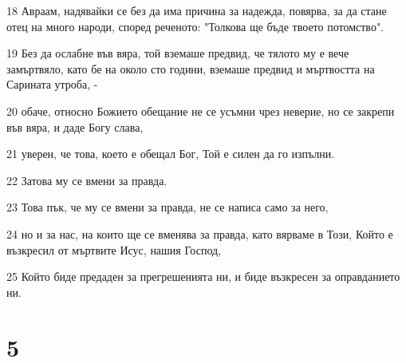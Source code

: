 \par 18 Авраам, надявайки се без да има причина за надежда, повярва, за да стане отец на много народи, според реченото: "Толкова ще бъде твоето потомство".
\par 19 Без да ослабне във вяра, той вземаше предвид, че тялото му е вече замъртвяло, като бе на около сто години, вземаше предвид и мъртвостта на Сарината утроба, -
\par 20 обаче, относно Божието обещание не се усъмни чрез неверие, но се закрепи във вяра, и даде Богу слава,
\par 21 уверен, че това, което е обещал Бог, Той е силен да го изпълни.
\par 22 Затова му се вмени за правда.
\par 23 Това пък, че му се вмени за правда, не се написа само за него,
\par 24 но и за нас, на които ще се вменява за правда, като вярваме в Този, Който е възкресил от мъртвите Исус, нашия Господ,
\par 25 Който биде предаден за прегрешенията ни, и биде възкресен за оправданието ни.

\chapter{5}

